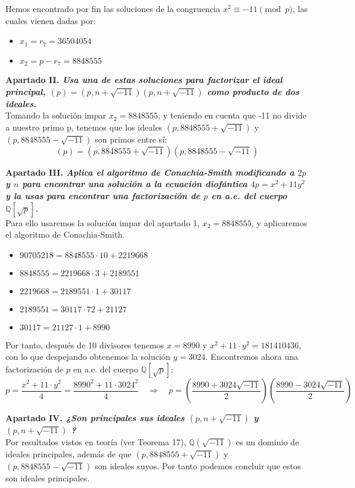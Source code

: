 \documentclass[fleqn]{article}
\def\Q{\mathds{Q}}
\def\next{\quad \Rightarrow \quad}
\begin{document}
    Hemos encontrado por fin las soluciones de la congruencia $x^2 \equiv -11 \pmod{p}$, las cuales vienen dadas por:
    \begin{itemize}
        \item $x_1 = r_7 = 36504054 $
        \item $x_2 = p - r_7 = 8848555$
    \end{itemize}


    \newpage
    \textbf{Apartado II. \textit{Usa una de estas soluciones para factorizar el ideal principal, 
                                $(p) = (p, n+ \sqrt{-11})(p, n+ \sqrt{-11})$ como producto de dos ideales.}}\\
    Tomando la solución impar $x_2 = 8848555$, y teniendo en cuenta que -11 no divide a nuestro primo p, tenemos que los ideales
    $\left(p,8848555 + \sqrt{-11}\right)$ y $\left(p,8848555 - \sqrt{-11}\right)$ son primos entre sí:
    $$ (p) = \left(p,8848555 + \sqrt{-11}\right)\left(p,8848555 - \sqrt{-11}\right)$$

    \newpage
    \textbf{Apartado III. \textit{Aplica el algoritmo de Conachia-Smith modificando a $2p$ y $n$ para encontrar
                                una solución a la ecuación diofántica $4p = x^2 + 11y^2 $ y la usas para encontrar 
                                una factorización de $p$ en a.e. del cuerpo $\Q[\sqrt{p}]$.}} \\
    Para ello usaremos la solución impar del apartado 1, $x_2 = 8848555$, y aplicaremos el algoritmo de Conachia-Smith.

    \begin{itemize}
        \item $90705218=8848555 \cdot 10+2219668$
        \item $8848555=2219668 \cdot 3+2189551$
        \item $2219668=2189551 \cdot 1+30117$
        \item $2189551=30117 \cdot 72+21127$
        \item $30117=21127 \cdot 1+8990$
    \end{itemize}
    Por tanto, después de 10 divisores tenemos $x = 8990$ y $x^2 + 11 \cdot y^2 = 181410436$, con lo que despejando obtenemos
    la solución $y = 3024$. Encontremos ahora una factorización de $p$ en a.e. del cuerpo $\Q[\sqrt{p}]$:
    $$p = \frac{x^2 + 11 \cdot y^2}{4} = \frac{8990^2 + 11 \cdot 3024^2}{4} \next  p = \left(\frac{8990 + 3024 \sqrt{-11}}{2}\right) \left(\frac{8990 - 3024 \sqrt{-11}}{2}\right)$$

    \newpage
    \textbf{Apartado IV. \textit{¿Son principales sus ideales $(p, n+ \sqrt{-11})$ y $(p, n+ \sqrt{-11})$ ?}}\\
    Por resultados vistos en teoría (ver Teorema 17), $\Q(\sqrt{-11})$ es un dominio de ideales principales, además
    de que $\left(p,8848555 + \sqrt{-11}\right)$ y $\left(p,8848555 - \sqrt{-11}\right)$ son ideales suyos. Por tanto 
    podemos concluir que estos son ideales principales.
\end{document}
